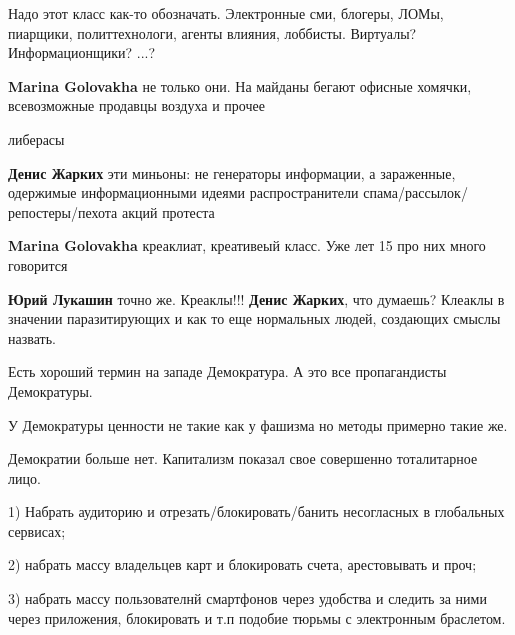  
 
 
 
 
\zzSecCmt

\begin{itemize} %
Надо этот класс как-то обозначать.
Электронные сми, блогеры, ЛОМы, пиарщики, политтехнологи, агенты влияния, лоббисты.
Виртуалы?
Информационщики?
...?

\begin{itemize} %
\textbf{Marina Golovakha} не только они. На майданы бегают офисные хомячки, всевозможные продавцы воздуха и прочее

либерасы

\textbf{Денис Жарких} эти миньоны: не генераторы информации, а зараженные, одержимые информационными идеями распространители спама/рассылок/репостеры/пехота акций протеста

\textbf{Marina Golovakha} креаклиат, креативеый класс. Уже лет 15 про них много говорится

\textbf{Юрий Лукашин} точно же.
Креаклы!!!
\textbf{Денис Жарких}, что думаешь?
Клеаклы в значении паразитирующих и как то еще нормальных людей, создающих смыслы назвать.

Есть хороший термин на западе Демократура. А это все пропагандисты Демократуры.

У Демократуры ценности не такие как у фашизма но методы примерно такие же.

\end{itemize} %


Демократии больше нет. Капитализм показал свое совершенно тоталитарное лицо.

1) Набрать аудиторию и отрезать/блокировать/банить несогласных в глобальных
сервисах;

2) набрать массу владельцев карт и блокировать счета, арестовывать и проч;

3) набрать массу пользователнй смартфонов через удобства и следить за ними
через приложения, блокировать и т.п подобие тюрьмы с электронным браслетом.


\end{itemize}
